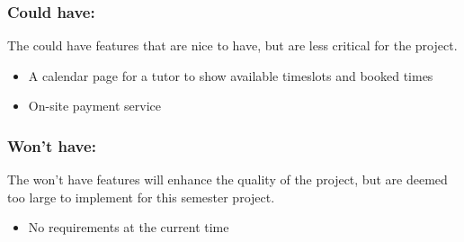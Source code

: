 \subsubsection{Could have:}
The could have features that are nice to have, but are less critical for the project.

\begin{itemize}
    \item A calendar page for a tutor to show available timeslots and booked times
    \item On-site payment service
\end{itemize}

\subsubsection{Won't have:}
The won't have features will enhance the quality of the project, but are deemed too large to implement for this semester project.
\begin{itemize}
    \item No requirements at the current time
\end{itemize}